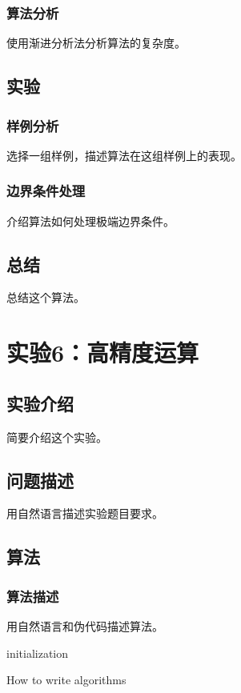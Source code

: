 \documentclass{ctexrep}
\begin{document}
\subsection{算法分析}
使用渐进分析法分析算法的复杂度。

\section{实验}
\subsection{样例分析}
选择一组样例，描述算法在这组样例上的表现。
\subsection{边界条件处理}
介绍算法如何处理极端边界条件。

\section{总结}
总结这个算法。

\chapter{实验6：高精度运算}
\section{实验介绍}
简要介绍这个实验。

\section{问题描述}
用自然语言描述实验题目要求。

\section{算法}
\subsection{算法描述}
用自然语言和伪代码描述算法。
\begin{algorithm}
\SetAlgoLined
{}
 initialization\;
 \caption{How to write algorithms}
\end{algorithm}
\end{document}
